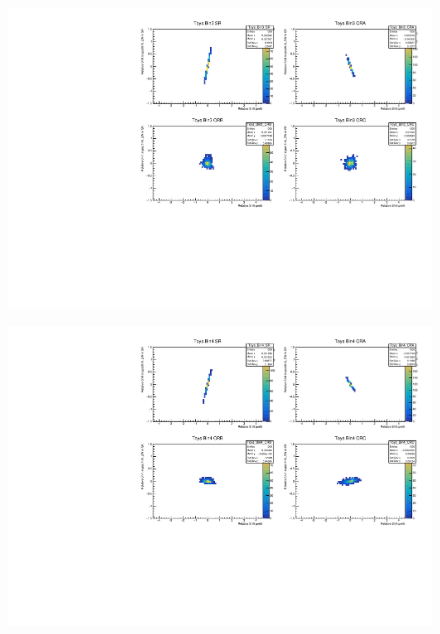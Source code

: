 \begin{figure}[H]
\includegraphics[width=\textwidth]{plots/diffx/instab/constfx/instabilities_mjj_QCD_Sh2211_Signal_Sh2211_BSDATASTATS_madgraphasimov_bin3.pdf}
\end{figure}
\begin{figure}[H]
\includegraphics[width=\textwidth]{plots/diffx/instab/constfx/instabilities_mjj_QCD_Sh2211_Signal_Sh2211_BSDATASTATS_madgraphasimov_bin4.pdf}
\end{figure}

